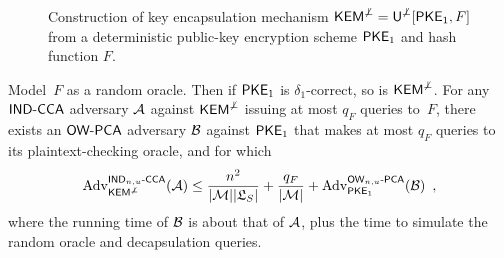 \begin{figure}[h]
\centering
{}
\caption{Construction of key encapsulation mechanism $\KEMnotperp=\Unotperp[\PKEOne, F]$ from a deterministic public-key encryption scheme $\PKEOne$ and hash function $F$.}
\label{fig:Unotperp}
\end{figure}


\begin{lemma}%
  \label{lem:Unotperp}
  Model~$F$ as a random oracle.  Then if $\PKEOne$ is
  $\delta_1$-correct, so is $\KEMnotperp$.  For any $\INDCCA$
  adversary $\Adversary$ against $\KEMnotperp$ issuing at
  most $q_F$ queries to~$F$, there exists an $\OWPCA$ adversary
  $\Bdversary$ against $\PKEOne$ that makes at most $q_F$ queries to
  its plaintext-checking oracle, and for which
  \[
    \Adv{\MINDCCA}{\KEMnotperp}(\Adversary) \leq \frac{n^2}{|\M||\saltlist|} + \frac{q_F}{|\MsgSp|} +
    \Adv{\MOWPCA}{\PKEOne}(\Bdversary) \enspace ,
  \]
  where the running time of $\Bdversary$ is about that of
  $\Adversary$, plus the time to simulate the random oracle and
  decapsulation queries.
\end{lemma}

